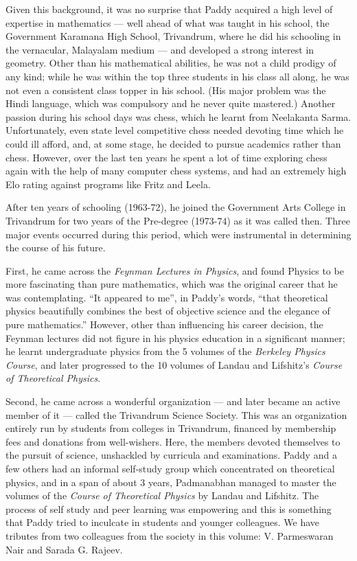 \documentclass[prd, preprint, longbibliography, 11pt]{revtex4-1}
\begin{document}
Given this background, it was no surprise that Paddy acquired a high
level of expertise in mathematics --- well ahead of what was taught in
his school, the Government Karamana High School, Trivandrum, where he
did his schooling in the vernacular, Malayalam medium --- and
developed a strong interest in geometry.
Other than his mathematical abilities, he was not a child prodigy of
any kind; while he was within the top three students in his class all
along, he was not even a consistent class topper in his school.
(His major problem was the Hindi language, which was compulsory and he
never quite mastered.)
Another passion during his school days was chess, which  he learnt
from Neelakanta Sarma.
Unfortunately, even state level competitive chess needed devoting time
which he could ill afford, and, at some stage, he decided to pursue
academics rather than chess.
However, over the last ten years he spent a
lot of time exploring chess again with the help of many computer chess
systems, and had an extremely high Elo rating against programs like
Fritz and Leela. 

After ten years of schooling (1963-72), he joined the Government Arts
College in Trivandrum for two years of the Pre-degree (1973-74) as it
was called then.
Three major events occurred during this period, which were
instrumental in determining the course of his future.  

First, he came across the \textit{Feynman Lectures in Physics}, and
found Physics to be more fascinating than pure mathematics, which was
the original career that he was contemplating.
``It appeared to me'', in Paddy's words, ``that theoretical physics
beautifully combines the best of objective science and the elegance of
pure mathematics.''
However, other than influencing his career decision, the Feynman
lectures did not figure in his physics education in a significant
manner; he learnt undergraduate physics from the 5 volumes of the
\textit{Berkeley Physics Course}, and later progressed to the 10
volumes of Landau and Lifshitz's \textit{Course of Theoretical
  Physics}.   

Second, he came across a wonderful organization --- and later became
an active member of it --- called the Trivandrum Science Society.
This was an organization entirely run by students from colleges in
Trivandrum, financed by membership fees and donations from
well-wishers.
Here, the members devoted themselves to the pursuit of science,
unshackled by curricula and examinations.
Paddy and a few others had an informal self-study group which
concentrated on theoretical physics, and in a span of about 3 years,
Padmanabhan managed to master the volumes of the \textit{Course of
  Theoretical Physics} by Landau and Lifshitz.
The process of self study and peer learning was empowering and this is
something that Paddy tried to inculcate in students and younger
colleagues. 
We have tributes from two colleagues from the society in this volume:
V. Parmeswaran Nair and Sarada G. Rajeev.
\end{document}
